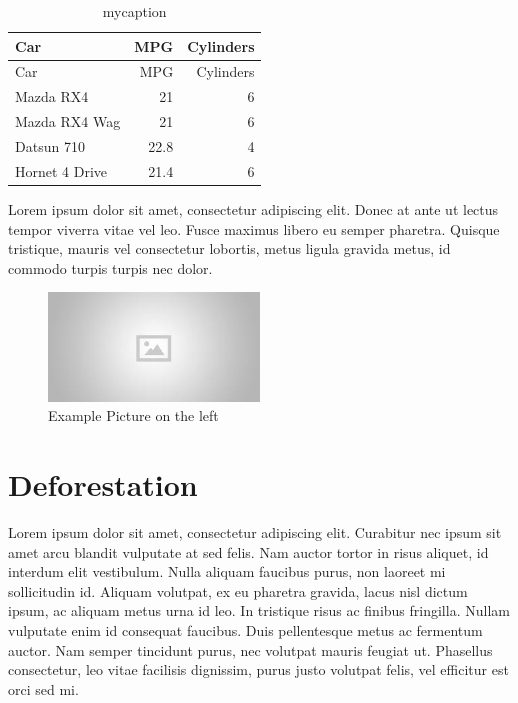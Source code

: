 \documentclass[
  letterpaper,
  DIV=11,
  numbers=noendperiod]{scrreprt}
\begin{document}
\hypertarget{tbl-mytable2}{}
\begin{longtable}[]{@{}lrr@{}}
\caption{\label{tbl-mytable2}mycaption}\tabularnewline
\toprule\noalign{}
Car & MPG & Cylinders \\
\midrule\noalign{}
\endfirsthead
\toprule\noalign{}
Car & MPG & Cylinders \\
\midrule\noalign{}
\endhead
\bottomrule\noalign{}
\endlastfoot
Mazda RX4 & 21 & 6 \\
Mazda RX4 Wag & 21 & 6 \\
Datsun 710 & 22.8 & 4 \\
Hornet 4 Drive & 21.4 & 6 \\
\end{longtable}

Lorem ipsum dolor sit amet, consectetur adipiscing elit. Donec at ante
ut lectus tempor viverra vitae vel leo. Fusce maximus libero eu semper
pharetra. Quisque tristique, mauris vel consectetur lobortis, metus
ligula gravida metus, id commodo turpis turpis nec dolor.

\begin{figure}

\includegraphics[width=0.5\textwidth,height=\textheight]{placeholder.jpg} \hfill{}

\caption{Example Picture on the left}

\end{figure}

\hypertarget{deforestation}{%
\section{Deforestation}\label{deforestation}}

Lorem ipsum dolor sit amet, consectetur adipiscing elit. Curabitur nec
ipsum sit amet arcu blandit vulputate at sed felis. Nam auctor tortor in
risus aliquet, id interdum elit vestibulum. Nulla aliquam faucibus
purus, non laoreet mi sollicitudin id. Aliquam volutpat, ex eu pharetra
gravida, lacus nisl dictum ipsum, ac aliquam metus urna id leo. In
tristique risus ac finibus fringilla. Nullam vulputate enim id consequat
faucibus. Duis pellentesque metus ac fermentum auctor. Nam semper
tincidunt purus, nec volutpat mauris feugiat ut. Phasellus consectetur,
leo vitae facilisis dignissim, purus justo volutpat felis, vel efficitur
est orci sed mi.
\end{document}
